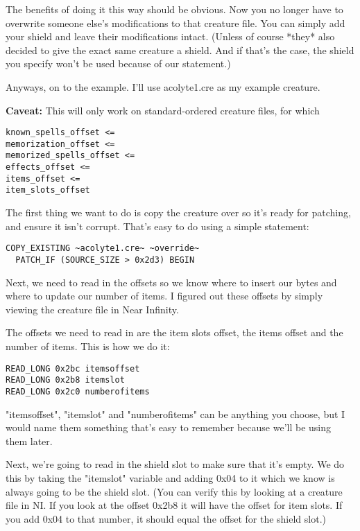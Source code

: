 \documentclass{article}
\def\ttref#1{\ahrefloc{#1}{\tt #1}}
\begin{document}
The benefits of doing it this way should be obvious.  Now you no longer
have to overwrite someone else's modifications to that creature file.  You
can simply add your shield and leave their modifications intact.  (Unless
of course *they* also decided to give the exact same creature a shield.
And if that's the case, the shield you specify won't be used because of our
\ttref{PATCH!IF} statement.)

Anyways, on to the example.  I'll use acolyte1.cre as my example creature.

\textbf{Caveat:} This will only work on standard-ordered creature files, for
which
\begin{verbatim}
known_spells_offset <=
memorization_offset <=
memorized_spells_offset <=
effects_offset <=
items_offset <=
item_slots_offset
\end{verbatim}

The first thing we want to do is copy the creature over so it's ready for
patching, and ensure it isn't corrupt.  That's easy to do using a simple
\ttref{COPY!EXISTING} statement:

\begin{verbatim}
COPY_EXISTING ~acolyte1.cre~ ~override~
  PATCH_IF (SOURCE_SIZE > 0x2d3) BEGIN
\end{verbatim}

Next, we need to read in the offsets so we know where to insert our bytes and
where to update our number of items.  I figured out these offsets by simply
viewing the creature file in Near Infinity.

The offsets we need to read in are the item slots offset, the items offset and
the number of items.  This is how we do it:

\begin{verbatim}
READ_LONG 0x2bc itemsoffset
READ_LONG 0x2b8 itemslot
READ_LONG 0x2c0 numberofitems
\end{verbatim}

"itemsoffset", "itemslot" and "numberofitems" can be anything you choose, but I
would name them something that's easy to remember because we'll be using
them later.

Next, we're going to read in the shield slot to make sure that it's empty.
We do this by taking the "itemslot" variable and adding 0x04 to it which we
know is always going to be the shield slot.  (You can verify this by
looking at a creature file in NI.  If you look at the offset 0x2b8 it will
have the offset for item slots.  If you add 0x04 to that number, it should
equal the offset for the shield slot.)
\end{document}
